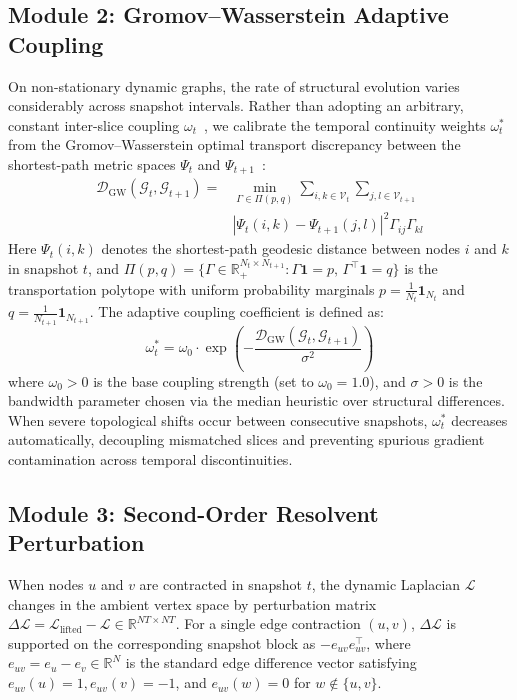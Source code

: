 \documentclass[sigconf]{acmart}
\begin{document}
\subsection{Module 2: Gromov--Wasserstein Adaptive Coupling}
\label{sec:module2}
On non-stationary dynamic graphs, the rate of structural evolution varies considerably across snapshot intervals. Rather than adopting an arbitrary, constant inter-slice coupling $\omega_t$~\cite{pareja2020evolvegcn,sacod2026}, we calibrate the temporal continuity weights $\omega_t^*$ from the Gromov--Wasserstein optimal transport discrepancy between the shortest-path metric spaces $\Psi_t$ and $\Psi_{t+1}$~\cite{chowdhury2019gromov}:
\begin{equation}
\label{eq:gw_full}
\begin{split}
\mathcal{D}_{\text{GW}}(\mathcal{G}_t, \mathcal{G}_{t+1}) = {}& \min_{\Gamma \in \Pi(p, q)} \sum_{i, k \in \mathcal{V}_t} \sum_{j, l \in \mathcal{V}_{t+1}} \\
& \left| \Psi_t(i, k) - \Psi_{t+1}(j, l) \right|^2 \Gamma_{ij} \Gamma_{kl}
\end{split}
\end{equation}
Here $\Psi_t(i, k)$ denotes the shortest-path geodesic distance between nodes $i$ and $k$ in snapshot $t$, and $\Pi(p, q) = \{ \Gamma \in \mathbb{R}_+^{N_t \times N_{t+1}} : \Gamma \mathbf{1} = p, \, \Gamma^\top \mathbf{1} = q \}$ is the transportation polytope with uniform probability marginals $p = \frac{1}{N_t}\mathbf{1}_{N_t}$ and $q = \frac{1}{N_{t+1}}\mathbf{1}_{N_{t+1}}$. The adaptive coupling coefficient is defined as:
\begin{equation}
\label{eq:omega_star}
\omega_t^* = \omega_0 \cdot \exp\left( - \frac{\mathcal{D}_{\text{GW}}(\mathcal{G}_t, \mathcal{G}_{t+1})}{\sigma^2} \right)
\end{equation}
where $\omega_0 > 0$ is the base coupling strength (set to $\omega_0 = 1.0$), and $\sigma > 0$ is the bandwidth parameter chosen via the median heuristic over structural differences. When severe topological shifts occur between consecutive snapshots, $\omega_t^*$ decreases automatically, decoupling mismatched slices and preventing spurious gradient contamination across temporal discontinuities.

\subsection{Module 3: Second-Order Resolvent Perturbation}
\label{sec:module3}
When nodes $u$ and $v$ are contracted in snapshot $t$, the dynamic Laplacian $\mathcal{L}$ changes in the ambient vertex space by perturbation matrix $\Delta \mathcal{L} = \mathcal{L}_{\text{lifted}} - \mathcal{L} \in \mathbb{R}^{NT \times NT}$. For a single edge contraction $(u, v)$, $\Delta \mathcal{L}$ is supported on the corresponding snapshot block as $-e_{uv} e_{uv}^\top$, where $e_{uv} = e_u - e_v \in \mathbb{R}^N$ is the standard edge difference vector satisfying $e_{uv}(u) = 1, e_{uv}(v) = -1$, and $e_{uv}(w) = 0$ for $w \notin \{u, v\}$. 
\end{document}
